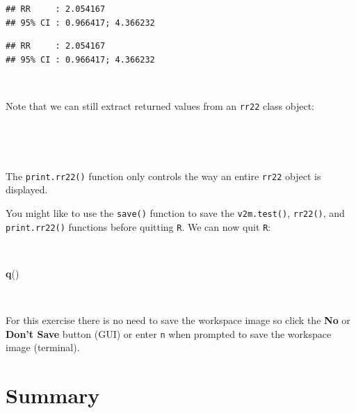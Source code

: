 \documentclass[12pt,a4paper]{book}
\newenvironment{Shaded}{\begin{snugshade}}{\end{snugshade}}
\newcommand{\KeywordTok}[1]{\textcolor[rgb]{0.13,0.29,0.53}{\textbf{#1}}}
\newcommand{\OperatorTok}[1]{\textcolor[rgb]{0.81,0.36,0.00}{\textbf{#1}}}
\newcommand{\NormalTok}[1]{#1}
\theoremstyle{definition}
\theoremstyle{definition}
\theoremstyle{definition}
\theoremstyle{remark}
\begin{document}
\begin{verbatim}
## RR     : 2.054167
## 95% CI : 0.966417; 4.366232
\end{verbatim}

\begin{verbatim}
## RR     : 2.054167
## 95% CI : 0.966417; 4.366232
\end{verbatim}

~

Note that we can still extract returned values from an \texttt{rr22}
class object:

~

\begin{Shaded}
\end{Shaded}

~

The \texttt{print.rr22()} function only controls the way an entire
\texttt{rr22} object is displayed.

You might like to use the \texttt{save()} function to save the
\texttt{v2m.test()}, \texttt{rr22()}, and \texttt{print.rr22()}
functions before quitting \texttt{R}. We can now quit \texttt{R}:

~

\begin{Shaded}
\begin{Highlighting}[]
\KeywordTok{q}\NormalTok{()}
\end{Highlighting}
\end{Shaded}

~

For this exercise there is no need to save the workspace image so click
the \textbf{No} or \textbf{Don't Save} button (GUI) or enter \texttt{n}
when prompted to save the workspace image (terminal).

\hypertarget{summary-5}{%
\section{Summary}\label{summary-5}}
\end{document}
